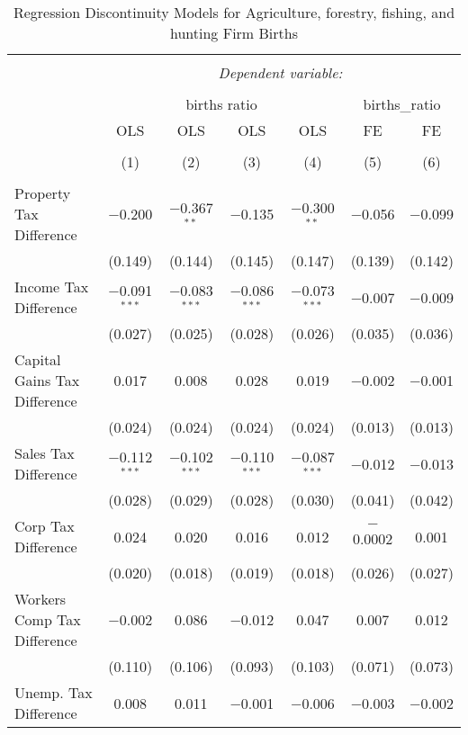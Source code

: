 
\begin{table}[!htbp] \centering 
  \caption{Regression Discontinuity Models for  Agriculture, forestry, fishing, and hunting Firm Births} 
  \label{11rd} 
\begin{tabular}{@{\extracolsep{5pt}}lcccccc} 
\\[-1.8ex]\hline 
\hline \\[-1.8ex] 
 & \multicolumn{6}{c}{\textit{Dependent variable:}} \\ 
\cline{2-7} 
\\[-1.8ex] & \multicolumn{4}{c}{births ratio} & \multicolumn{2}{c}{births\_ratio} \\ 
 & OLS & OLS & OLS & OLS & FE & FE \\ 
\\[-1.8ex] & (1) & (2) & (3) & (4) & (5) & (6)\\ 
\hline \\[-1.8ex] 
 Property Tax Difference & $-$0.200 & $-$0.367$^{**}$ & $-$0.135 & $-$0.300$^{**}$ & $-$0.056 & $-$0.099 \\ 
  & (0.149) & (0.144) & (0.145) & (0.147) & (0.139) & (0.142) \\ 
  Income Tax Difference & $-$0.091$^{***}$ & $-$0.083$^{***}$ & $-$0.086$^{***}$ & $-$0.073$^{***}$ & $-$0.007 & $-$0.009 \\ 
  & (0.027) & (0.025) & (0.028) & (0.026) & (0.035) & (0.036) \\ 
  Capital Gains Tax Difference & 0.017 & 0.008 & 0.028 & 0.019 & $-$0.002 & $-$0.001 \\ 
  & (0.024) & (0.024) & (0.024) & (0.024) & (0.013) & (0.013) \\ 
  Sales Tax Difference & $-$0.112$^{***}$ & $-$0.102$^{***}$ & $-$0.110$^{***}$ & $-$0.087$^{***}$ & $-$0.012 & $-$0.013 \\ 
  & (0.028) & (0.029) & (0.028) & (0.030) & (0.041) & (0.042) \\ 
  Corp Tax Difference & 0.024 & 0.020 & 0.016 & 0.012 & $-$0.0002 & 0.001 \\ 
  & (0.020) & (0.018) & (0.019) & (0.018) & (0.026) & (0.027) \\ 
  Workers Comp Tax Difference & $-$0.002 & 0.086 & $-$0.012 & 0.047 & 0.007 & 0.012 \\ 
  & (0.110) & (0.106) & (0.093) & (0.103) & (0.071) & (0.073) \\ 
  Unemp. Tax Difference & 0.008 & 0.011 & $-$0.001 & $-$0.006 & $-$0.003 & $-$0.002 \\ 

\end{tabular}
\end{table}
